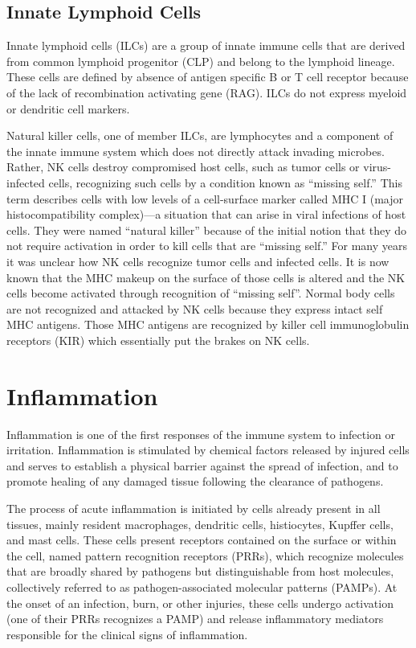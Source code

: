 \hypertarget{innate-lymphoid-cells}{%
\subsection{Innate Lymphoid Cells}\label{innate-lymphoid-cells}}

Innate lymphoid cells (ILCs) are a group of innate immune cells that are derived from common lymphoid progenitor (CLP) and belong to the lymphoid lineage. These cells are defined by absence of antigen specific B or T cell receptor because of the lack of recombination activating gene (RAG). ILCs do not express myeloid or dendritic cell markers.

Natural killer cells, one of member ILCs, are lymphocytes and a component of the innate immune system which does not directly attack invading microbes. Rather, NK cells destroy compromised host cells, such as tumor cells or virus-infected cells, recognizing such cells by a condition known as ``missing self.'' This term describes cells with low levels of a cell-surface marker called MHC I (major histocompatibility complex)---a situation that can arise in viral infections of host cells. They were named ``natural killer'' because of the initial notion that they do not require activation in order to kill cells that are ``missing self.'' For many years it was unclear how NK cells recognize tumor cells and infected cells. It is now known that the MHC makeup on the surface of those cells is altered and the NK cells become activated through recognition of ``missing self''. Normal body cells are not recognized and attacked by NK cells because they express intact self MHC antigens. Those MHC antigens are recognized by killer cell immunoglobulin receptors (KIR) which essentially put the brakes on NK cells.

\hypertarget{inflammation}{%
\section{Inflammation}\label{inflammation}}

Inflammation is one of the first responses of the immune system to infection or irritation. Inflammation is stimulated by chemical factors released by injured cells and serves to establish a physical barrier against the spread of infection, and to promote healing of any damaged tissue following the clearance of pathogens.

The process of acute inflammation is initiated by cells already present in all tissues, mainly resident macrophages, dendritic cells, histiocytes, Kupffer cells, and mast cells. These cells present receptors contained on the surface or within the cell, named pattern recognition receptors (PRRs), which recognize molecules that are broadly shared by pathogens but distinguishable from host molecules, collectively referred to as pathogen-associated molecular patterns (PAMPs). At the onset of an infection, burn, or other injuries, these cells undergo activation (one of their PRRs recognizes a PAMP) and release inflammatory mediators responsible for the clinical signs of inflammation.

